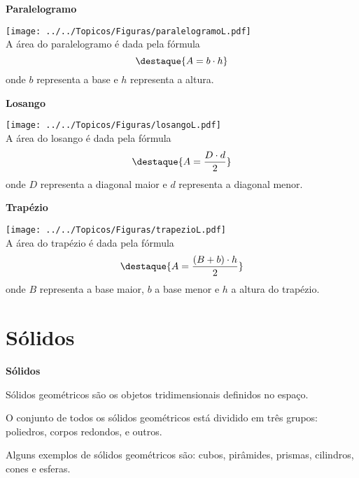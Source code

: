 \textbf{Paralelogramo}
\begin{multicols}{2}
\texttt{[image: ../../Topicos/Figuras/paralelogramoL.pdf]} \\
A área do paralelogramo é dada pela fórmula
\[\destaque{A= b \cdot h}\]
onde $b$ representa a base e $h$ representa a altura.
\end{multicols}

\newpage

\textbf{Losango}
\begin{multicols}{2}
\texttt{[image: ../../Topicos/Figuras/losangoL.pdf]} \\
A área do losango é dada pela fórmula
\[\destaque{A= \frac{D \cdot d}{2}}\]
onde $D$ representa a diagonal maior e $d$ representa a diagonal menor.
\end{multicols}

\textbf{Trapézio}
\begin{multicols}{2}
\texttt{[image: ../../Topicos/Figuras/trapezioL.pdf]} \\
A área do trapézio é dada pela fórmula
\[\destaque{A= \frac{(B+b)\cdot h}{2}}\]
onde $B$ representa a base maior, $b$ a base menor e $h$ a altura do trapézio.
\end{multicols}

\section{Sólidos}

\vskip0.3cm

\colorbox{azul}{
 \begin{minipage}{14.5cm}
 \begin{center}
 \textbf{Sólidos}
 
  Sólidos geométricos são os objetos tridimensionais definidos no espaço. 
  
  O conjunto de todos os sólidos geométricos está dividido em três grupos: poliedros, corpos redondos, e outros.
  
 \end{center}
 \end{minipage}}
 
 \vskip0.3cm
 
 Alguns exemplos de sólidos geométricos são: cubos, pirâmides, prismas, cilindros, cones e esferas.
 


\begin{figure}[H]
\center
{}
\qquad
{}
\end{figure}

